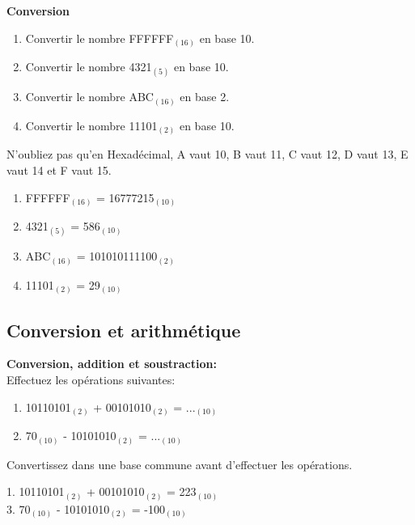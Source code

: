 \begin{Exercice}[10 minutes]  \textbf{Conversion }\\
    \begin{enumerate}
        \item Convertir le nombre FFFFFF$_{(16)}$ en base 10.
        \item Convertir le nombre 4321$_{(5)}$ en base 10.
        \item Convertir le nombre ABC$_{(16)}$ en base 2.
        \item Convertir le nombre 11101$_{(2)}$ en base 10.
    \end{enumerate}
    
        \begin{conseil}
            N'oubliez pas qu'en Hexadécimal, A vaut 10, B vaut 11, C vaut 12, D vaut 13, E vaut 14 et F vaut 15.
    \end{conseil}

    \begin{solution}
        \begin{enumerate}
            \item FFFFFF$_{(16)}$ = 16777215$_{(10)}$
            \item 4321$_{(5)}$ = 586$_{(10)}$
            \item ABC$_{(16)}$ = 101010111100$_{(2)}$
            \item 11101$_{(2)}$ = 29$_{(10)}$
        \end{enumerate}
    \end{solution}
\end{Exercice}

\subsection{Conversion et arithmétique}
\begin{Exercice}[5 minutes] \textbf{Conversion, addition et soustraction:}\\
    Effectuez les opérations suivantes:
    \begin{enumerate}
        \item 10110101$_{(2)}$ + 00101010$_{(2)}$ = ...$_{(10)}$
        \item 70$_{(10)}$ - 10101010$_{(2)}$ = ...$_{(10)}$
    \end{enumerate}
        \begin{conseil}
        Convertissez dans une base commune avant d'effectuer les opérations.
    \end{conseil}
        
    \begin{solution}
        1. 10110101$_{(2)}$ + 00101010$_{(2)}$ = 223$_{(10)}$\\
        3. 70$_{(10)}$ - 10101010$_{(2)}$ = -100$_{(10)}$
    \end{solution}
\end{Exercice}



